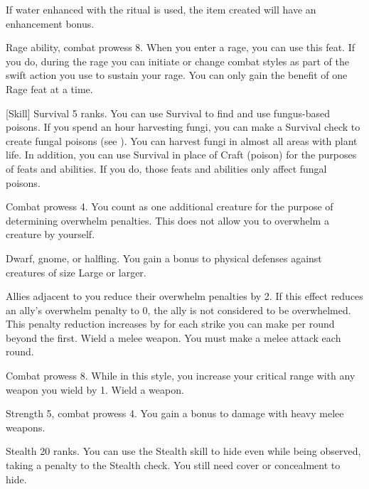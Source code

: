 If water enhanced with the  ritual is used, the item created will have an enhancement bonus.

\featpres Rage ability, combat prowess 8.
\featben When you enter a rage, you can use this feat. If you do, during the rage you can initiate or change combat styles as part of the swift action you use to sustain your rage.
 You can only gain the benefit of one Rage feat at a time.

[Skill]
\featpre Survival 5 ranks.
\featben You can use Survival to find and use fungus-based poisons.
If you spend an hour harvesting fungi, you can make a Survival check to create fungal poisons (see ).
You can harvest fungi in almost all areas with plant life.
In addition, you can use Survival in place of Craft (poison) for the purposes of feats and abilities.
If you do, those feats and abilities only affect fungal poisons.

\featpre Combat prowess 4.
\featben You count as one additional creature for the purpose of determining overwhelm penalties.
This does not allow you to overwhelm a creature by yourself.

\featpres Dwarf, gnome, or halfling.
\featben You gain a  bonus to physical defenses against creatures of size Large or larger.

\featben Allies adjacent to you reduce their overwhelm penalties by 2.
If this effect reduces an ally's overwhelm penalty to 0, the ally is not considered to be overwhelmed.
This penalty reduction increases by  for each strike you can make per round beyond the first.
\stylereq Wield a melee weapon.
You must make a melee attack each round.

\featpre Combat prowess 8.
\featben While in this style, you increase your critical range with any weapon you wield by 1.
\stylereq Wield a weapon.

\featpres Strength 5, combat prowess 4.
\featben You gain a  bonus to damage with heavy melee weapons.

\featpre Stealth 20 ranks.
\featben You can use the Stealth skill to hide even while being observed, taking a  penalty to the Stealth check.
You still need cover or concealment to hide.


